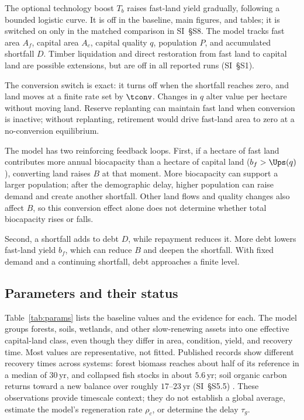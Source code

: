 The optional technology boost $T_b$ raises fast-land yield gradually, following a bounded logistic curve. It is off in the baseline, main figures, and tables; it is switched on only in the matched comparison in SI~\S S8. The model tracks fast area $A_f$, capital area $A_c$, capital quality $q$, population $P$, and accumulated shortfall $D$. Timber liquidation and direct restoration from fast land to capital land are possible extensions, but are off in all reported runs (SI~\S S1).

The conversion switch is exact: it turns off when the shortfall reaches zero, and land moves at a finite rate set by $\tconv$. Changes in $q$ alter value per hectare without moving land. Reserve replanting can maintain fast land when conversion is inactive; without replanting, retirement would drive fast-land area to zero at a no-conversion equilibrium.

The model has two reinforcing feedback loops. First, if a hectare of fast land contributes more annual biocapacity than a hectare of capital land ($b_f>\Ups(q)$), converting land raises $B$ at that moment. More biocapacity can support a larger population; after the demographic delay, higher population can raise demand and create another shortfall. Other land flows and quality changes also affect $B$, so this conversion effect alone does not determine whether total biocapacity rises or falls.

Second, a shortfall adds to debt $D$, while repayment reduces it. More debt lowers fast-land yield $b_f$, which can reduce $B$ and deepen the shortfall. With fixed demand and a continuing shortfall, debt approaches a finite level.

\subsection{Parameters and their status}\label{sec:params}

Table~\ref{tab:params} lists the baseline values and the evidence for each. The model groups forests, soils, wetlands, and other slow-renewing assets into one effective capital-land class, even though they differ in area, condition, yield, and recovery time. Most values are representative, not fitted. Published records show different recovery times across systems: forest biomass reaches about half of its reference in a median of $30$\,yr, and collapsed fish stocks in about $5.6$\,yr; soil organic carbon returns toward a new balance over roughly $17$--$23$\,yr (SI~\S S5.5) \citep{Poorter2016,HutchingsReynolds2004,Neubauer2013,Poeplau2011}. These observations provide timescale context; they do not establish a global average, estimate the model's regeneration rate $\rho_c$, or determine the delay $\tau_g$.


